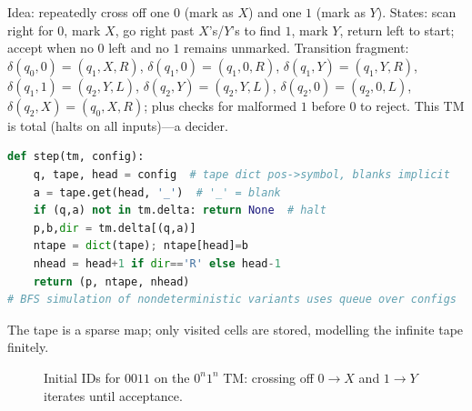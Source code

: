 \begin{example}[TM for $L=\{0^n1^n\mid n\ge0\}$]
Idea: repeatedly cross off one $0$ (mark as $X$) and one $1$ (mark as $Y$). States: scan right for $0$, mark $X$, go right past $X$'s/$Y$'s to find $1$, mark $Y$, return left to start; accept when no $0$ left and no $1$ remains unmarked. Transition fragment: $\delta(q_0,0)=(q_1,X,R)$, $\delta(q_1,0)=(q_1,0,R)$, $\delta(q_1,Y)=(q_1,Y,R)$, $\delta(q_1,1)=(q_2,Y,L)$, $\delta(q_2,Y)=(q_2,Y,L)$, $\delta(q_2,0)=(q_2,0,L)$, $\delta(q_2,X)=(q_0,X,R)$; plus checks for malformed $1$ before $0$ to reject. This TM is total (halts on all inputs)---a decider.
\end{example}

\begin{example}
\begin{lstlisting}[language=Python]
def step(tm, config):
    q, tape, head = config  # tape dict pos->symbol, blanks implicit
    a = tape.get(head, '_')  # '_' = blank
    if (q,a) not in tm.delta: return None  # halt
    p,b,dir = tm.delta[(q,a)]
    ntape = dict(tape); ntape[head]=b
    nhead = head+1 if dir=='R' else head-1
    return (p, ntape, nhead)
# BFS simulation of nondeterministic variants uses queue over configs
\end{lstlisting}
The tape is a sparse map; only visited cells are stored, modelling the infinite tape finitely.
\end{example}

\begin{figure}[h]
\centering
{}
\caption{Initial IDs for $0011$ on the $0^n1^n$ TM: crossing off $0\to X$ and $1\to Y$ iterates until acceptance.}
\label{fig:tm-ids}
\end{figure}

